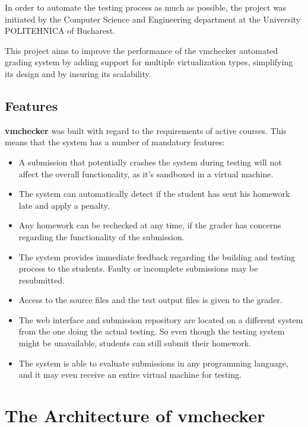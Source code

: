 In order to automate the testing process as much as possible, the \project project 
was initiated by the Computer Science and Engineering department at the 
University POLITEHNICA of Bucharest.

This project aims to improve the performance of the vmchecker automated grading
system by adding support for multiple virtualization types, simplifying its
design and by insuring its scalability.


\subsection{Features}
\label{sub-sec:vmc-history-features}

{\bf vmchecker} was built with regard to the requirements of active courses. This
means that the system has a number of mandatory features:

\begin{itemize}
\item A submission that potentially crashes the system during testing will not affect
the overall functionality, as it's sandboxed in a virtual machine.
\item The system can automatically detect if the student has sent his homework late
and apply a penalty.
\item Any homework can be rechecked at any time, if the grader has concerns regarding
the functionality of the submission.
\item The system provides immediate feedback regarding the building and testing 
process to the students. Faulty or incomplete submissions may be resubmitted.
\item Access to the source files and the test output files is given to the grader.
\item The web interface and submission repository are located on a different system
from the one doing the actual testing. So even though the testing system might
be unavailable, students can still submit their homework.
\item The system is able to evaluate submissions in any programming language,
and it may even receive an entire virtual machine for testing.
\end{itemize}


\section{The Architecture of vmchecker}
\label{sec:vmc-architecture}

